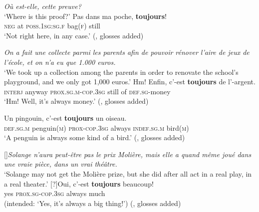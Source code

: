 \begin{exe}	
	\ex
	\begin{xlist}
		 \textit{Où est-elle, cette preuve?}\\
		\lq Where is this proof?\rq{}
		\gll Pas dans ma poche, \textbf{toujours}!\\
		\textsc{neg} at \textsc{poss}.1\textsc{sg}:\textsc{sg}.\textsc{f} bag(\textsc{f}) still\\
	\glt \lq Not right here, in any case.\rq{ }(\cite[25]{MosegaardHansen2002}, glosses added)
	\end{xlist}
	
	\ex
	\begin{xlist}
		 \textit{On a fait une collecte parmi les parents afin de pouvoir rénover l’aire de jeux de l’école, et on n’a eu que 1.000 euros.}\\
	\lq We took up a collection among the parents in order to renovate the school’s playground, and we only got 1,000 euros.'
	\gll Hm! Enfin, c’-est \textbf{toujours} de l\rq{}-argent.\\
	\textsc{interj} anyway  \textsc{prox}.\textsc{sg}.\textsc{m}-\textsc{cop}.3\textsc{sg} still of \textsc{def}.\textsc{sg}-money\\
	\glt \lq Hm! Well, it's always money.' (\cite[172]{MosegaardHansen2008}, glosses added)
	\end{xlist}
	
	\ex
	\gll Un pingouin, c\rq{}-est \textbf{toujours} un oiseau.\\
	\textsc{def}.\textsc{sg}.\textsc{m} penguin(\textsc{m}) \textsc{prox}-\textsc{cop}.3\textsc{sg} always \textsc{indef}.\textsc{sg}.\textsc{m} bird(\textsc{m})\\
	\glt \lq A penguin is always some kind of a bird.\rq{ }(\cite[180]{MosegaardHansen2008}, glosses added)

	\ex\label{exAppendixFrenchToujoursMarginality3}
	\begin{xlist}
		[]{\textit{Solange n’aura peut-être pas le prix Molière, mais elle a quand même joué dans une vraie pièce, dans un vrai théâtre.}\\
		\lq Solange may not get the Molière prize, but she did after all act in a real play, in a real theater.\rq{}}
		[?]{\gll Oui, c’-est \textbf{toujours} beaucoup!\\
		yes \textsc{prox}.\textsc{sg}-\textsc{cop}.3\textsc{sg} always much\\
		\glt (intended: \lq Yes, it’s always a big thing!\rq{}) (\cite[178]{MosegaardHansen2008}, glosses added)}
	\end{xlist}
\end{exe}


